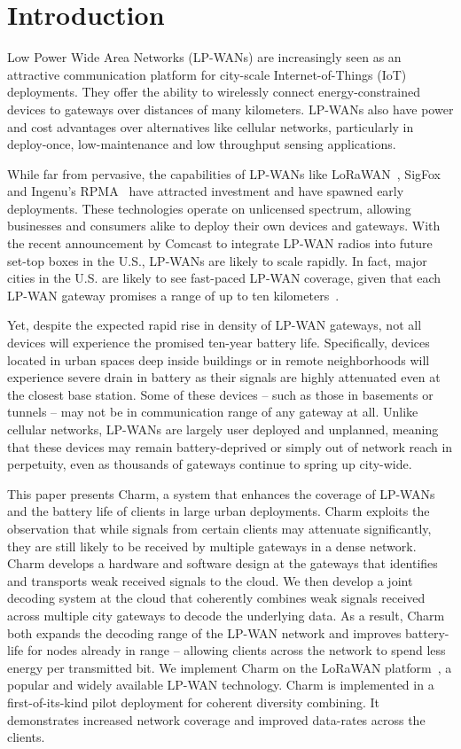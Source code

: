 
\section{Introduction}
\label{sec:intro}

Low Power Wide Area Networks (LP-WANs) are increasingly seen as an attractive
communication platform for city-scale Internet-of-Things (IoT) deployments.
They offer the ability to wirelessly connect energy-constrained devices to
gateways over distances of many kilometers. LP-WANs also have power and cost
advantages over alternatives like cellular networks, particularly in
deploy-once, low-maintenance and low throughput sensing applications.

While far from pervasive, the capabilities of LP-WANs like
LoRaWAN~\cite{Sornin2015, LoRaWanAlliance2015}, SigFox~\cite{centenaro2016}
and Ingenu's RPMA~\cite{Ingenu2015} have attracted investment and have spawned
early deployments. These technologies operate on unlicensed spectrum, allowing
businesses and consumers alike to deploy their own devices and gateways. With
the recent announcement by Comcast \cite{comcast, comcast2} to integrate
LP-WAN radios into future set-top boxes in the U.S., LP-WANs are likely to
scale rapidly. In fact, major cities in the U.S. are likely to see fast-paced
LP-WAN coverage, given that each LP-WAN gateway promises a range of up to ten
kilometers~\cite{LoRaWanAlliance2015}.

Yet, despite the expected rapid rise in density of LP-WAN gateways, not all
devices will experience the promised ten-year battery life. Specifically,
devices located in urban spaces deep inside buildings or in remote
neighborhoods will experience severe drain in battery as their signals are
highly attenuated even at the closest base station. Some of these devices --
such as those in basements or tunnels -- may not be in communication range of
any gateway at all. Unlike cellular networks, LP-WANs are largely user
deployed and unplanned, meaning that these devices may remain battery-deprived
or simply out of network reach in perpetuity, even as thousands of gateways
continue to spring up city-wide.

This paper presents Charm, a system that enhances the coverage of LP-WANs and
the battery life of clients in large urban deployments. Charm exploits the
observation that while signals from certain clients may attenuate
significantly, they are still likely to be received by multiple gateways in a
dense network. Charm develops a hardware and software design at the gateways
that identifies and transports weak received signals to the cloud. We then
develop a joint decoding system at the cloud that coherently combines weak
signals received across multiple city gateways to decode the underlying data.
As a result, Charm both expands the decoding range of the LP-WAN network and
improves battery-life for nodes already in range -- allowing clients across
the network to spend less energy per transmitted bit. We implement Charm on
the LoRaWAN platform~\cite{LoRaWanAlliance2015}, a popular and widely
available LP-WAN technology. Charm is implemented in a first-of-its-kind pilot
deployment for coherent diversity combining. It demonstrates increased
network coverage and improved data-rates across the clients.

